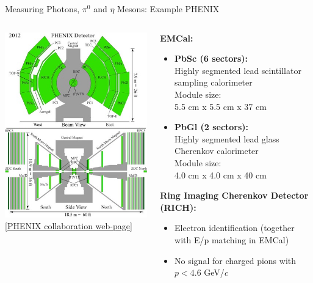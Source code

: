 \documentclass[aspectratio=169,10pt]{beamer}
\begin{document}
    \begin{frame}{Measuring Photons, $\pi^0$ and $\eta$ Mesons: Example PHENIX}
   \begin{columns}
      \begin{column}{6cm}
        \includegraphics[height=0.85\textheight]{EMLectureWeek2018/Phenix.jpg}\\
        \tiny \href{https://www.phy.ornl.gov/groups/heavy_ions/RHIC.html}{[PHENIX collaboration web-page]}
      \end{column}
      \begin{column}{9cm}
        \textbf{EMCal:}\\
        \begin{itemize}
          \item \textbf{PbSc (6 sectors): } \\
                Highly segmented lead scintillator sampling calorimeter  \\
                Module size: \\
                5.5 cm x 5.5 cm x 37 cm 
          \item \textbf{PbGl (2 sectors):}\\
                Highly segmented lead glass Cherenkov calorimeter  \\
                Module size:\\
                4.0 cm x 4.0 cm x 40 cm 
        \end{itemize}
        \textbf{Ring Imaging Cherenkov Detector (RICH):}
        \begin{itemize}
         \item Electron identification (together with E/p matching in EMCal) 
         \item No signal for charged pions with $p < 4.6$ GeV/$c$
        \end{itemize}


\end{column}
\end{columns}
\end{frame}
\end{document}
